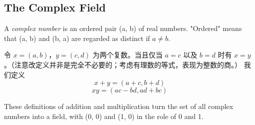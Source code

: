 \documentclass[../poma-note.tex]{subfiles}
\begin{document}
\subsection*{The Complex Field}

\begin{definition}
	A \textit{complex number} is an ordered pair (a, b) of real numbers. "Ordered" means that (a, b) and (b, a)
	are regarded as distinct if $a \neq b$.
\end{definition}

令 $x=(a,b)$，$y=(c,d)$ 为两个复数。当且仅当 $a=c$ 以及 $b=d$ 时有 $x=y$。（注意改定义并非是完全不必要的；考虑有理数的等式，表现为整数的商。）
我们定义
\[x+y=(a+c,b+d)\]
\[xy=(ac-bd,ad+bc)\]

\setcounter{poma}{24}
\begin{theorem}
	These definitions of addition and multiplication turn the set of all complex numbers into a field, with (0, 0)
	and (1, 0) in the role of 0 and 1.
\end{theorem}
\end{document}
